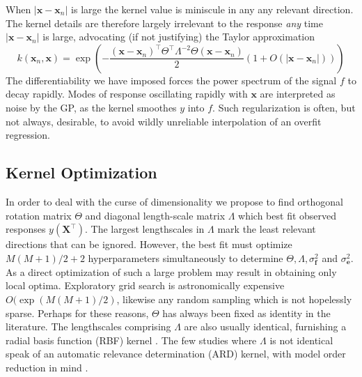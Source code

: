 \documentclass[preprint,12pt]{elsarticle}
\newcommand*{\M}[1]{\ensuremath{#1}\xspace}
\newcommand*{\vr}[1]{\M{\mathbf{#1}}}
\newcommand*{\modulus}[1]{\M{\left\lvert#1\right\rvert}}
\begin{document}
            When $\modulus{\vr{x}-\vr{x}_{n}}$ is large the kernel value is miniscule in any any relevant direction. The kernel details are therefore largely irrelevant to the response \emph{any} time $\modulus{\vr{x}-\vr{x}_{n}}$ is large, advocating (if not justifying) the Taylor approximation
            \begin{equation*}
                k(\vr{x}_{n},\vr{x}) = 
                \exp \left(-\frac
                    {(\vr{x}-\vr{x}_{n})^{\intercal} \Theta^{\intercal}\Lambda^{-2}\Theta (\vr{x}-\vr{x}_{n})}{2}
                    \left(1+O(\modulus{\vr{x}-\vr{x}_{n}})\right)
                \right)             
            \end{equation*}
            The differentiability we have imposed forces the power spectrum of the signal $f$ to decay rapidly. 
            Modes of response oscillating rapidly with $\vr{x}$ are interpreted as noise by the GP, as the kernel smoothes $y$ into $f$. Such regularization is often, but not always, desirable, to avoid wildly unreliable interpolation of an overfit regression.

        \subsection{Kernel Optimization}
            In order to deal with the curse of dimensionality we propose to find orthogonal rotation matrix $\Theta$ and diagonal length-scale matrix $\Lambda$ which best fit observed responses $y(\vr{X}^{\intercal})$. The largest lengthscales in $\Lambda$ mark the least relevant directions that can be ignored. However, the best fit must optimize $M(M+1)/2+2$ hyperparameters simultaneously to determine $\Theta, \Lambda, \sigma^{2}_\vr{f}$ and $\sigma^{2}_\vr{e}$. As a direct optimization of such a large problem may result in obtaining only local optima. Exploratory grid search is astronomically expensive $O(\exp(M(M+1)/2)$, likewise any random sampling which is not hopelessly sparse. Perhaps for these reasons, $\Theta$ has always been fixed as identity in the literature. The lengthscales comprising $\Lambda$ are also usually identical, furnishing a radial basis function (RBF) kernel \cite{Sacks.etal1989}. The few studies where $\Lambda$ is not identical speak of an automatic relevance determination (ARD) kernel, with model order reduction in mind \cite{Wipf.Nagarajan2007, Neal1996}.
\end{document}
